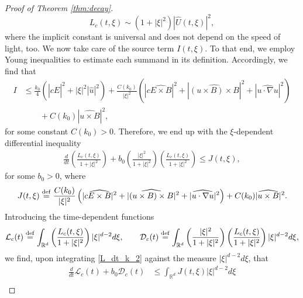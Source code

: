 \documentclass[11pt, leqno, a4paper,]{amsart}
\theoremstyle{remark}
\numberwithin{equation}{section}
\newcommand*{\bydef}{\overset{\rm def}{=}}
\begin{document}
\begin{proof}[Proof of Theorem \ref{thm:decay}]
\begin{equation}\label{Equiv_E_k_L_k}
L_c(t,\xi)\sim (1+|\xi|^2) |\widehat U(t,\xi)|^2, 
\end{equation}
where the implicit constant is universal and does not depend on the speed of light, too.
We now take care of the source term $I(t,\xi)$. To that end, we employ Young inequalities  to estimate each summand in its definition. Accordingly,  we find that   
\begin{equation*}
	\begin{aligned}
		I &\leq  \frac{k_0}{4} \left(    |c \widehat E|^2 + |\xi|^2 |\widehat u|^2   \right)+ \frac{C(k_0)}{|\xi|^2}   \left( |c\widehat { E\times B} | ^2  + | \widehat {( u\times B) \times B}| ^2 + | \widehat { u\cdot \nabla u}| ^2 \right) 
		\\
		&\qquad + C(k_0) |\widehat { u\times B}|^2,
	\end{aligned}
\end{equation*}
for some constant $C(k_0)>0$.
Therefore, we end up with the $\xi$-dependent differential inequality   
\begin{equation}\label{L_dt_k_2}
\begin{aligned}
\frac{d}{dt}  \left( \frac{L_c(t,\xi)}{ 1+ |\xi|^2 } \right)   + b_0      \left( \frac{|\xi|^2}{ 1+ |\xi|^2 } \right)  \left( \frac{ L_c(t,\xi)}{1+|\xi|^2}\right)  
\leq  J(t,\xi),
\end{aligned}
\end{equation} 
for some $b_0>0$, where 
\begin{equation*}
	J(t,\xi) \bydef \frac{C(k_0)}{|\xi|^2}   \left( |c\widehat { E\times B} | ^2  + | \widehat {( u\times B) \times B}| ^2 + | \widehat { u\cdot \nabla u}| ^2 \right) + C(k_0) |\widehat { u\times B}|^2.
\end{equation*}
Introducing the time-dependent functions 
\begin{equation*}
	\mathcal{L}_c(t) \bydef \int_{\mathbb R^d} \left ( \frac{L_c(t,\xi)}{ 1+ |\xi|^2 } \right) |\xi|^{d-2}d\xi , \qquad\mathcal{D}_c (t) \bydef \int_{\mathbb R^d}  \left( \frac{|\xi|^2}{ 1+ |\xi|^2 } \right)  \left( \frac{ L_c(t,\xi)}{1+|\xi|^2}\right)  |\xi|^{d-2}d\xi ,
\end{equation*}
we find, upon integrating \eqref{L_dt_k_2}  against the measure $|\xi|^{d-2}d\xi $, that 
\begin{equation*}
 \begin{aligned}
 	\frac{d}{dt} \mathcal{L}_c(t) + b_0\mathcal{D}_c(t) 
 	&\leq   \int_{\mathbb R^d} J(t,\xi) |\xi|^{d-2}d\xi
 	\\

\end{aligned}
\end{equation*}
\end{proof}
\end{document}
